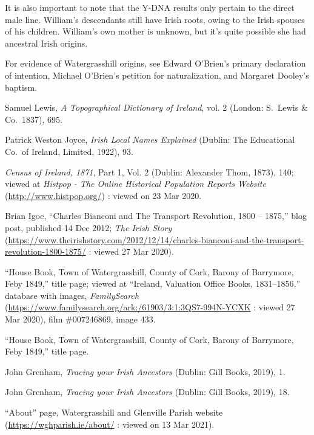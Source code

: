 It is also important to note that the Y-DNA results only pertain to the direct male line. William's descendants still have Irish roots, owing to the Irish spouses of his children. William's own mother is unknown, but it's quite possible she had ancestral Irish origins.

\begin{thebibliography}{999}

For evidence of Watergrasshill origins, see Edward O'Brien's primary declaration of intention, Michael O'Brien's petition for naturalization, and Margaret Dooley's baptism.

Samuel Lewis, \textit{A Topographical Dictionary of Ireland}, vol. 2 (London: S.\ Lewis \& Co.\, 1837), 695.

Patrick Weston Joyce, \textit{Irish Local Names Explained} (Dublin: The Educational Co.\ of Ireland, Limited, 1922), 93.

\textit{Census of Ireland, 1871}, Part 1, Vol. 2 (Dublin: Alexander Thom, 1873), 140; viewed at \textit{Histpop - The Online Historical Population Reports Website} (\url{http://www.histpop.org/}) : viewed on 23 Mar 2020.

Brian Igoe, ``Charles Bianconi and The Transport Revolution, 1800 -- 1875,'' blog post, published 14 Dec 2012; \textit{The Irish Story} (\url{https://www.theirishstory.com/2012/12/14/charles-bianconi-and-the-transport-revolution-1800-1875/} : viewed 27 Mar 2020).

``House Book, Town of Watergrasshill, County of Cork, Barony of Barrymore, Feby 1849,'' title page; viewed at ``Ireland, Valuation Office Books, 1831--1856,'' database with images, \textit{FamilySearch} (\url{https://www.familysearch.org/ark:/61903/3:1:3QS7-994N-YCXK} : viewed 27 Mar 2020), film \#007246869, image 433.

``House Book, Town of Watergrasshill, County of Cork, Barony of Barrymore, Feby 1849,'' title page.

John Grenham, \textit{Tracing your Irish Ancestors} (Dublin: Gill Books, 2019), 1.

John Grenham, \textit{Tracing your Irish Ancestors} (Dublin: Gill Books, 2019), 18.

``About'' page, Watergrasshill and Glenville Parish website (\url{https://wghparish.ie/about/} : viewed on 13 Mar 2021). 


\end{thebibliography}
